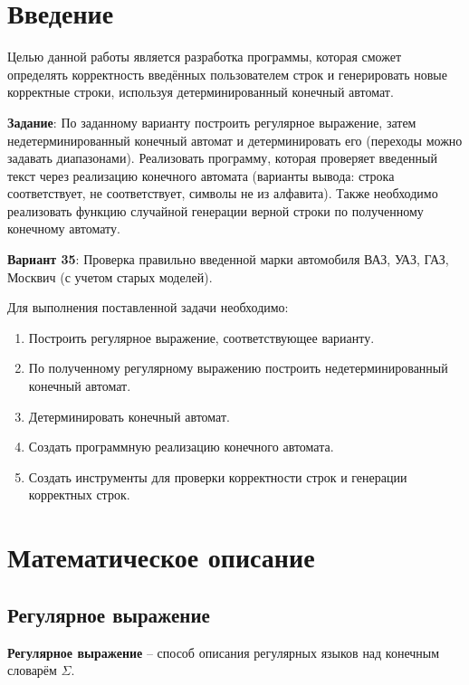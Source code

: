 \documentclass[a4paper,final]{article}
\begin{document}
\section*{Введение}

Целью данной работы является разработка программы, которая сможет определять корректность введённых пользователем строк и генерировать новые корректные строки, используя детерминированный конечный автомат.

\textbf{Задание}: По заданному варианту построить регулярное выражение, затем недетерминированный конечный автомат и детерминировать его (переходы можно задавать диапазонами). Реализовать программу, которая проверяет введенный текст через реализацию конечного автомата (варианты вывода: строка соответствует, не соответствует, символы не из алфавита). Также необходимо реализовать функцию случайной генерации верной строки по полученному конечному автомату.

\textbf{Вариант 35}: Проверка правильно введенной марки автомобиля ВАЗ, УАЗ, ГАЗ, Москвич (с учетом старых моделей).

Для выполнения поставленной задачи необходимо:
\begin{enumerate}
    \item Построить регулярное выражение, соответствующее варианту.
    \item По полученному регулярному выражению построить недетерминированный конечный автомат.
    \item Детерминировать конечный автомат.
    \item Создать программную реализацию конечного автомата.
    \item Создать инструменты для проверки корректности строк и генерации корректных строк.
\end{enumerate}

\newpage
\section{Математическое описание}
\subsection{Регулярное выражение}
\textbf{Регулярное выражение} -- способ описания регулярных языков над конечным словарём $\Sigma$.
\end{document}
